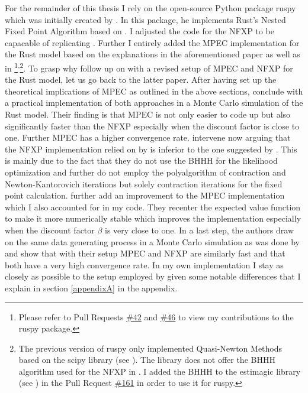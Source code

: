 For the remainder of this thesis I rely on the open-source Python package ruspy which was initially created by \cite{Blesch.2019}. In this package, he implements Rust's Nested Fixed Point Algorithm based on \cite{Rust.2000}. I adjusted the code for the NFXP to be capacable of replicating \cite{Iskhakov.2016}. Further I entirely added the MPEC implementation for the Rust model based on the explanations in the aforementioned paper as well as in \cite{Su.Judd.2012} \footnote{ Please refer to Pull Requests \href{https://github.com/OpenSourceEconomics/ruspy/pull/42}{\#42} and \href{https://github.com/OpenSourceEconomics/ruspy/pull/46}{\#46} to view my contributions to the ruspy package.}\textsuperscript{,}\footnote{ The previous version of ruspy only implemented Quasi-Newton Methods based on the scipy library (see \cite{scipy.2020}). The library does not offer the BHHH algorithm used for the NFXP in \cite{Iskhakov.2016}. I added the BHHH to the estimagic library (see \cite{Gabler.2019}) in the Pull Request \href{https://github.com/OpenSourceEconomics/estimagic/pull/161}{\#161} in order to use it for ruspy.}. To grasp why \citeauthor{Iskhakov.2016} follow up on \citeauthor{Su.Judd.2012} with a revised setup of MPEC and NFXP for the Rust model, let us go back to the latter paper. After having set up the theoretical implications of MPEC as outlined in the above sections, \citeauthor{Su.Judd.2012} conclude with a practical implementation of both approaches in a Monte Carlo simulation of the Rust model. Their finding is that MPEC is not only easier to code up but also significantly faster than the NFXP especially when the discount factor is close to one. Further MPEC has a higher convergence rate. \citeauthor{Iskhakov.2016} intervene now arguing that the NFXP implementation relied on by \citeauthor{Su.Judd.2012} is inferior to the one suggested by \cite{Rust.2000}. This is mainly due to the fact that they do not use the BHHH for the likelihood optimization and further do not employ the polyalgorithm of contraction and Newton-Kantorovich iterations but solely contraction iterations for the fixed point calculation. \citeauthor{Iskhakov.2016} further add an improvement to the MPEC implementation which I also accounted for in my code. They recenter the expected value function to make it more numerically stable which improves the implementation especially when the discount factor $\beta$ is very close to one. In a last step, the authors draw on the same data generating process in a Monte Carlo simulation as was done by \citeauthor{Su.Judd.2012} and show that with their setup MPEC and NFXP are similarly fast and that both have a very high convergence rate. In my own implementation I stay as closely as possible to the setup employed by \citeauthor{Iskhakov.2016} given some notable differences that I explain in section \ref{appendixA} in the appendix.

